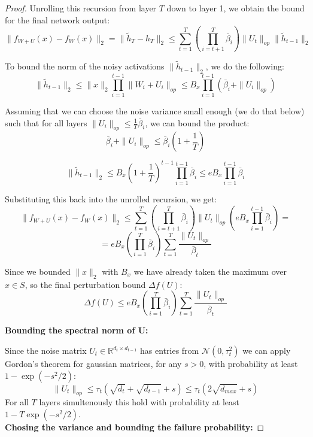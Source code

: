 \documentclass[a4paper,14pt]{extarticle}
\begin{document}
\begin{proof}
        Unrolling this recursion from layer $T$ down to layer 1, we obtain the bound for the final network output:
        $$ \|f_{W+U}(x) - f_W(x)\|_2 = \|\tilde{h}_T - h_T\|_2 \leqslant \sum_{t=1}^T \left( \prod_{i=t+1}^T \bar{\beta}_i \right) \|U_t\|_{op} \|\tilde{h}_{t-1}\|_2 $$

        To bound the norm of the noisy activations $\|\tilde{h}_{t-1}\|_2$, we do the following:
        $$ \|\tilde{h}_{t-1}\|_2 \leqslant \|x\|_2 \prod_{i=1}^{t-1} \|W_i + U_i\|_{op} \leqslant B_x \prod_{i=1}^{t-1} (\bar{\beta}_i + \|U_i\|_{op}) $$

        Assuming that we can choose the noise variance small enough (we do that below) such that for all layers $\|U_i\|_{op} \leqslant \frac{1}{T} \bar{\beta}_i$, we can bound the product:
        $$ \bar{\beta}_i + \|U_i\|_{op} \leqslant \bar{\beta}_i \left(1 + \frac{1}{T}\right) $$

        $$ \|\tilde{h}_{t-1}\|_2 \leqslant B_x \left(1 + \frac{1}{T}\right)^{t-1} \prod_{i=1}^{t-1} \bar{\beta}_i \leqslant e B_x \prod_{i=1}^{t-1} \bar{\beta}_i $$

        Substituting this back into the unrolled recursion, we get:
        $$ \|f_{W+U}(x) - f_W(x)\|_2 \leqslant \sum_{t=1}^T \left( \prod_{i=t+1}^T \bar{\beta}_i \right) \|U_t\|_{op} \left( e B_x \prod_{i=1}^{t-1} \bar{\beta}_i \right) = $$
        $$= e B_x \left( \prod_{i=1}^T \bar{\beta}_i \right) \sum_{t=1}^T \frac{\|U_t\|_{op}}{\bar{\beta}_t} $$

        Since we bounded $\|x\|_2$ with $B_x$ we have already taken the maximum over $x \in S$, so the final perturbation bound $\Delta f(U)$:
        $$ \Delta f(U) \leqslant e B_x \left( \prod_{i=1}^T \bar{\beta}_i \right) \sum_{t=1}^T \frac{\|U_t\|_{op}}{\bar{\beta}_t} $$


        \textbf{Bounding the spectral norm of U:} 

        Since the noise matrix $U_t \in \mathbb{R}^{d_t \times d_{t-1}}$ has entries from $\mathcal{N}(0, \tau_t^2)$ we can apply Gordon's theorem for gaussian matrices\cite{vershynin2018high}, for any $s > 0$, with probability at least $1 - \exp(-s^2/2)$:
        $$ \|U_t\|_{op} \leqslant \tau_t (\sqrt{d_t} + \sqrt{d_{t-1}} + s) \leqslant \tau_t (2\sqrt{d_{max}} + s) $$
        For all $T$ layers simultenously this hold with probability at least $1 - T\exp(-s^2/2)$.\\


        \textbf{Chosing the variance and bounding the failure probability:}


\end{proof}
\end{document}

